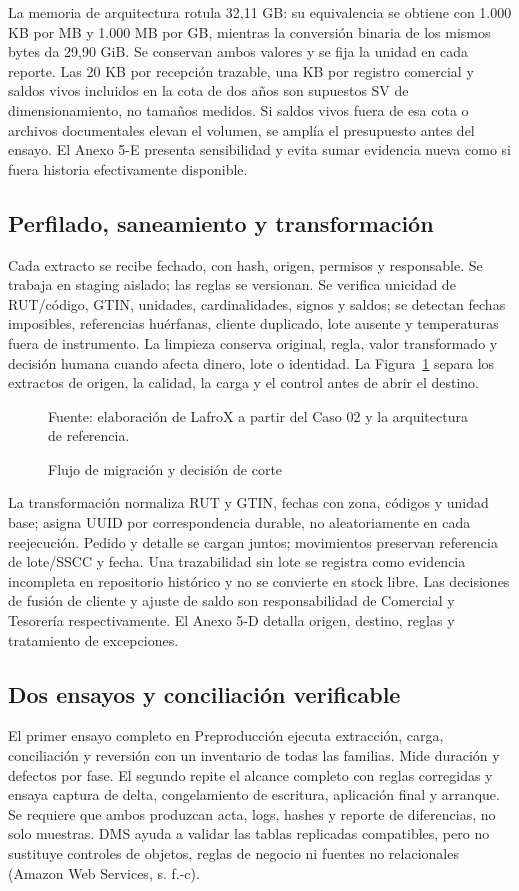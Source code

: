 La memoria de arquitectura rotula 32,11 GB: su equivalencia se obtiene con 1.000 KB por MB y 1.000 MB por GB, mientras la conversión binaria de los mismos bytes da 29,90 GiB. Se conservan ambos valores y se fija la unidad en cada reporte. Las 20 KB por recepción trazable, una KB por registro comercial y saldos vivos incluidos en la cota de dos años son supuestos SV de dimensionamiento, no tamaños medidos. Si saldos vivos fuera de esa cota o archivos documentales elevan el volumen, se amplía el presupuesto antes del ensayo. El Anexo 5-E presenta sensibilidad y evita sumar evidencia nueva como si fuera historia efectivamente disponible.

\subsection{Perfilado, saneamiento y transformación}
Cada extracto se recibe fechado, con hash, origen, permisos y responsable. Se trabaja en staging aislado; las reglas se versionan. Se verifica unicidad de RUT/código, GTIN, unidades, cardinalidades, signos y saldos; se detectan fechas imposibles, referencias huérfanas, cliente duplicado, lote ausente y temperaturas fuera de instrumento. La limpieza conserva original, regla, valor transformado y decisión humana cuando afecta dinero, lote o identidad.
La Figura~\ref{fig:5-migracion} separa los extractos de origen, la calidad, la carga y el control antes de abrir el destino.

\begin{figure}[htbp]
\centering

\caption{Flujo de migración y decisión de corte}
\label{fig:5-migracion}
{\fontsize{9pt}{11pt}\selectfont Fuente: elaboración de LafroX a partir del Caso 02 y la arquitectura de referencia.}
\end{figure}\FloatBarrier

La transformación normaliza RUT y GTIN, fechas con zona, códigos y unidad base; asigna UUID por correspondencia durable, no aleatoriamente en cada reejecución. Pedido y detalle se cargan juntos; movimientos preservan referencia de lote/SSCC y fecha. Una trazabilidad sin lote se registra como evidencia incompleta en repositorio histórico y no se convierte en stock libre. Las decisiones de fusión de cliente y ajuste de saldo son responsabilidad de Comercial y Tesorería respectivamente. El Anexo 5-D detalla origen, destino, reglas y tratamiento de excepciones.

\subsection{Dos ensayos y conciliación verificable}
El primer ensayo completo en Preproducción ejecuta extracción, carga, conciliación y reversión con un inventario de todas las familias. Mide duración y defectos por fase. El segundo repite el alcance completo con reglas corregidas y ensaya captura de delta, congelamiento de escritura, aplicación final y arranque. Se requiere que ambos produzcan acta, logs, hashes y reporte de diferencias, no solo muestras. DMS ayuda a validar las tablas replicadas compatibles, pero no sustituye controles de objetos, reglas de negocio ni fuentes no relacionales (Amazon Web Services, s. f.-c).


